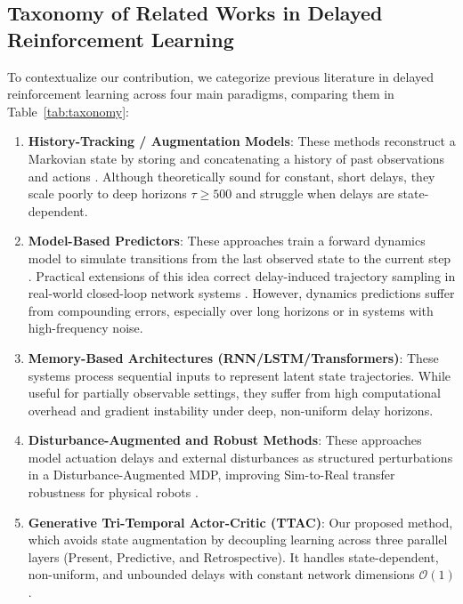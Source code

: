 \documentclass[manuscript, screen, review]{jair}
\begin{document}
\subsection{Taxonomy of Related Works in Delayed Reinforcement Learning}
To contextualize our contribution, we categorize previous literature in delayed reinforcement learning across four main paradigms, comparing them in Table~\ref{tab:taxonomy}:
\begin{enumerate}
    \item \textbf{History-Tracking / Augmentation Models}: These methods reconstruct a Markovian state by storing and concatenating a history of past observations and actions \citep{katsikopoulos2003markov, walsh2010choosing}. Although theoretically sound for constant, short delays, they scale poorly to deep horizons $\tau \ge 500$ and struggle when delays are state-dependent.
    \item \textbf{Model-Based Predictors}: These approaches train a forward dynamics model to simulate transitions from the last observed state to the current step \citep{schuitema2010control, bouteiller2020reinforcement}. Practical extensions of this idea correct delay-induced trajectory sampling in real-world closed-loop network systems \citep{du2022random}. However, dynamics predictions suffer from compounding errors, especially over long horizons or in systems with high-frequency noise.
    \item \textbf{Memory-Based Architectures (RNN/LSTM/Transformers)}: These systems process sequential inputs to represent latent state trajectories. While useful for partially observable settings, they suffer from high computational overhead and gradient instability under deep, non-uniform delay horizons.
    \item \textbf{Disturbance-Augmented and Robust Methods}: These approaches model actuation delays and external disturbances as structured perturbations in a Disturbance-Augmented MDP, improving Sim-to-Real transfer robustness for physical robots \citep{malmir2025diarl}.
    \item \textbf{Generative Tri-Temporal Actor-Critic (TTAC)}: Our proposed method, which avoids state augmentation by decoupling learning across three parallel layers (Present, Predictive, and Retrospective). It handles state-dependent, non-uniform, and unbounded delays with constant network dimensions $\mathcal{O}(1)$.
\end{enumerate}
\end{document}
